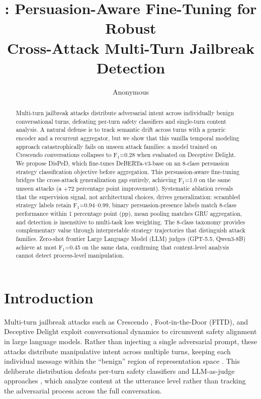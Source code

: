 \documentclass[11pt,a4paper]{article}
\title{\ours{}: Persuasion-Aware Fine-Tuning for Robust\\Cross-Attack Multi-Turn Jailbreak Detection}
\author{Anonymous}
\date{}
\newcommand{\ours}{DisPeD}
\newcommand{\fone}{F$_1$}
\begin{document}
\maketitle

\begin{abstract}
Multi-turn jailbreak attacks distribute adversarial intent across individually benign conversational turns, defeating per-turn safety classifiers and single-turn content analysis.
A natural defense is to track semantic drift across turns with a generic encoder and a recurrent aggregator, but we show that this vanilla temporal modeling approach catastrophically fails on unseen attack families: a model trained on Crescendo conversations collapses to \fone{}=0.28 when evaluated on Deceptive Delight.
We propose \ours{}, which fine-tunes DeBERTa-v3-base on an 8-class persuasion strategy classification objective before aggregation.
This persuasion-aware fine-tuning bridges the cross-attack generalization gap entirely, achieving \fone{}=1.0 on the same unseen attacks (a +72 percentage point improvement).
Systematic ablation reveals that the supervision signal, not architectural choices, drives generalization: scrambled strategy labels retain \fone{}=0.94--0.99, binary persuasion-presence labels match 8-class performance within 1 percentage point (pp), mean pooling matches GRU aggregation, and detection is insensitive to multi-task loss weighting.
The 8-class taxonomy provides complementary value through interpretable strategy trajectories that distinguish attack families.
Zero-shot frontier Large Language Model (LLM) judges (GPT-5.5, Qwen3-8B) achieve at most \fone{}=0.45 on the same data, confirming that content-level analysis cannot detect process-level manipulation.
\end{abstract}

\section{Introduction}

Multi-turn jailbreak attacks such as Crescendo \citep{russinovich2024}, Foot-in-the-Door (FITD), and Deceptive Delight \citep{jiang2024} exploit conversational dynamics to circumvent safety alignment in large language models.
Rather than injecting a single adversarial prompt, these attacks distribute manipulative intent across multiple turns, keeping each individual message within the ``benign'' region of representation space \citep{bullwinkel2025}.
This deliberate distribution defeats per-turn safety classifiers \citep{inan2023llamaguard,han2024wildguard,zeng2024shieldgemma} and LLM-as-judge approaches \citep{perez2022}, which analyze content at the utterance level rather than tracking the adversarial process across the full conversation.
\end{document}
